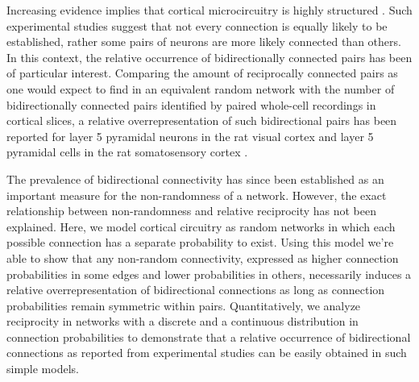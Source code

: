

Increasing evidence implies that cortical microcircuitry is highly structured \cite{Song2005,Perin2011}. Such experimental studies suggest that not every connection is equally likely to be established, rather some pairs of neurons are more likely connected than others. In this context, the relative occurrence of bidirectionally connected pairs has been of particular interest. Comparing the amount of reciprocally connected pairs as one would expect to find in an equivalent random network with the number of bidirectionally connected pairs identified by paired whole-cell recordings in cortical slices, a relative overrepresentation of such bidirectional pairs has been reported for layer 5 pyramidal neurons in the rat visual cortex \cite{Song2005} and layer 5 pyramidal cells in the rat somatosensory cortex \cite{Markram1997,Perin2011}.

The prevalence of bidirectional connectivity has since been established as an important measure for the non-randomness of a network. However, the exact relationship between non-randomness and relative reciprocity has not been explained. Here, we model cortical circuitry as random networks in which each possible connection has a separate probability to exist. Using this model we're able to show that any non-random connectivity, expressed as higher connection probabilities in some edges and lower probabilities in others, necessarily induces a relative overrepresentation of bidirectional connections as long as connection probabilities remain symmetric within pairs. Quantitatively, we analyze reciprocity in networks with a discrete and a continuous distribution in connection probabilities to demonstrate that a relative occurrence of bidirectional connections as reported from experimental studies can be easily obtained in such simple models.




